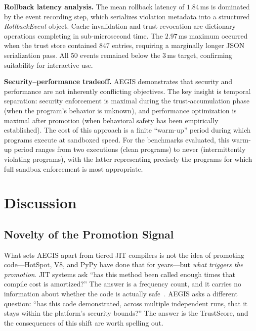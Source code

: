 \documentclass[conference]{IEEEtran}
\begin{document}
\textbf{Rollback latency analysis.}
The mean rollback latency of $1.84\,$ms is dominated by the
event recording step, which serializes violation metadata into
a structured \textit{RollbackEvent} object. Cache invalidation
and trust revocation are dictionary operations completing in
sub-microsecond time. The $2.97\,$ms maximum occurred when the
trust store contained 847 entries, requiring a marginally
longer JSON serialization pass. All 50 events remained below
the $3\,$ms target, confirming suitability for interactive use.

\textbf{Security--performance tradeoff.}
AEGIS demonstrates that security and performance are not
inherently conflicting objectives. The key insight is temporal
separation: security enforcement is maximal during the
trust-accumulation phase (when the program's behavior is
unknown), and performance optimization is maximal after
promotion (when behavioral safety has been empirically
established). The cost of this approach is a finite
``warm-up'' period during which programs execute at sandboxed
speed. For the benchmarks evaluated, this warm-up period
ranges from two executions (clean programs) to never
(intermittently violating programs), with the latter
representing precisely the programs for which full sandbox
enforcement is most appropriate.

\section{Discussion}
\label{sec:disc}

\subsection{Novelty of the Promotion Signal}

What sets AEGIS apart from tiered JIT compilers is not the
idea of promoting code---HotSpot, V8, and PyPy have done that
for years---but \emph{what triggers the promotion}.  JIT
systems ask ``has this method been called enough times that
compile cost is amortized?''  The answer is a frequency count,
and it carries no information about whether the code is
actually safe~\cite{qin2022jit_security}.  AEGIS asks a
different question: ``has this code demonstrated, across
multiple independent runs, that it stays within the platform's
security bounds?''  The answer is the TrustScore, and the
consequences of this shift are worth spelling out.
\end{document}
